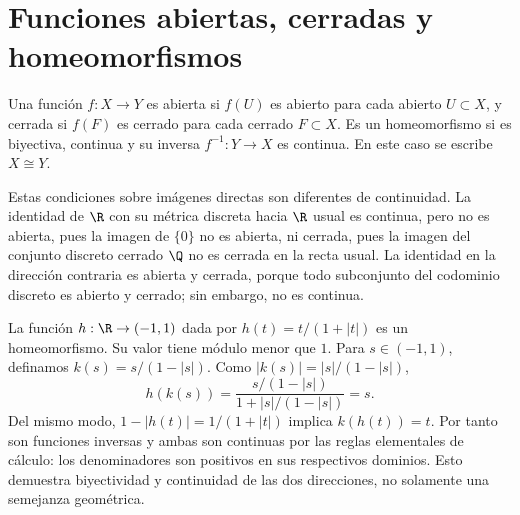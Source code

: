 \section{Funciones abiertas, cerradas y homeomorfismos}
\begin{definicion}
Una función $f:X\to Y$ es abierta si $f(U)$ es abierto para cada abierto $U\subset X$, y cerrada si $f(F)$ es cerrado para cada cerrado $F\subset X$. Es un homeomorfismo si es biyectiva, continua y su inversa $f^{-1}:Y\to X$ es continua. En este caso se escribe $X\cong Y$.
\end{definicion}
Estas condiciones sobre imágenes directas son diferentes de continuidad. La identidad de $\R$ con su métrica discreta hacia $\R$ usual es continua, pero no es abierta, pues la imagen de $\{0\}$ no es abierta, ni cerrada, pues la imagen del conjunto discreto cerrado $\Q$ no es cerrada en la recta usual. La identidad en la dirección contraria es abierta y cerrada, porque todo subconjunto del codominio discreto es abierto y cerrado; sin embargo, no es continua.

\begin{ejemplo}\label{ch05:homeorecta}
La función $h:\R\to(-1,1)$ dada por $h(t)=t/(1+|t|)$ es un homeomorfismo. Su valor tiene módulo menor que $1$. Para $s\in(-1,1)$, definamos $k(s)=s/(1-|s|)$. Como $|k(s)|=|s|/(1-|s|)$,
\[
h(k(s))=\frac{s/(1-|s|)}{1+|s|/(1-|s|)}=s.
\]
Del mismo modo, $1-|h(t)|=1/(1+|t|)$ implica $k(h(t))=t$. Por tanto son funciones inversas y ambas son continuas por las reglas elementales de cálculo: los denominadores son positivos en sus respectivos dominios. Esto demuestra biyectividad y continuidad de las dos direcciones, no solamente una semejanza geométrica.
\end{ejemplo}

